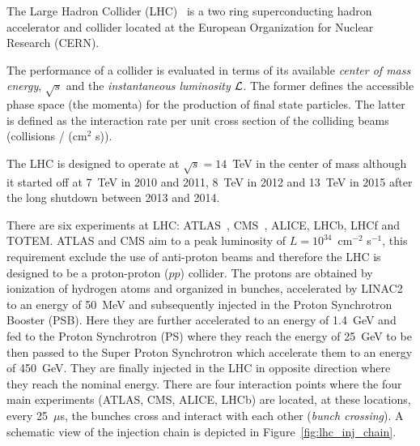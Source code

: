 The Large Hadron Collider (LHC)~\cite{LHC} is a two ring superconducting hadron
accelerator and collider located at the European Organization for Nuclear
Research (CERN).

The performance of a collider is evaluated in terms of its available
\emph{center of mass energy}, $\sqrt{s}$ and the \emph{instantaneous luminosity}
$\mathcal{L}$. The former defines the accessible phase space (the momenta) for the
production of final state particles. The latter is defined as the interaction
rate per unit cross section of the colliding beams (collisions / (cm$^2$
s)).

The LHC is designed to operate at $\sqrt{s} = 14$~TeV in the center of mass
although it started off at 7~TeV in 2010 and 2011, 8~TeV in 2012 and 13~TeV in
2015 after the long shutdown between 2013 and 2014.

There are six experiments at LHC: ATLAS~\cite{ATLASPaper},
CMS~\cite{1748-0221-3-08-S08004}, ALICE, LHCb, LHCf and TOTEM. ATLAS and CMS aim
to a peak luminosity of $L = 10^{34}$~cm$^{-2}$ s$^{-1}$, this requirement
exclude the use of anti-proton beams and therefore the LHC is designed to be a
proton-proton ($pp$) collider. The protons are obtained by ionization of
hydrogen atoms and organized in bunches, accelerated by LINAC2 to an energy of
50~MeV and subsequently injected in the Proton Synchrotron Booster (PSB). Here
they are further accelerated to an energy of 1.4~GeV and fed to the Proton
Synchrotron (PS) where they reach the energy of 25~GeV to be then passed to the
Super Proton Synchrotron which accelerate them to an energy of 450~GeV. They are
finally injected in the LHC in opposite direction where they reach the nominal
energy. There are four interaction points where the four main experiments
(ATLAS, CMS, ALICE, LHCb) are located, at these locations, every 25~$\mu$s, the
bunches cross and interact with each other (\emph{bunch crossing}). A schematic
view of the injection chain is depicted in Figure~\ref{fig:lhc_inj_chain}.

